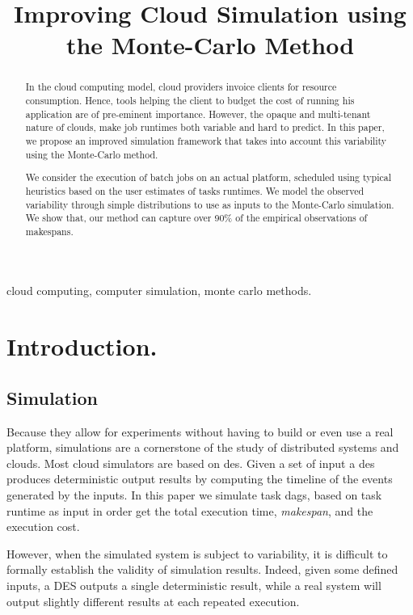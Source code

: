 \documentclass[10pt,conference,compsocconf]{IEEEtran}
\title{Improving Cloud Simulation using the Monte-Carlo Method}
\author{\IEEEauthorblockN{Luke~Bertot 
			and Stéphane~Genaud 
			and Julien~Gossa}
	\IEEEauthorblockA{Icube-ICPS --- UMR 7357, Univeristé de Strasbourg, CNRS\\
		P\^ole API Blvd S. Bant, 67400 Illkirch-Graffenstaden\\
		email: \url{lbertot@unistra.fr}, \url{genaud@unistra.fr}, \url{gossa@unistra.fr}}
	}
\begin{document}
\maketitle

\begin{abstract}
  In the  cloud computing  model, cloud providers  invoice clients  for resource
  consumption. Hence, tools helping the client to budget the cost of running his
  application are  of pre-eminent  importance. However, the opaque and 
  multi-tenant nature of clouds, make job runtimes both variable and hard to 
  predict.  In this  paper, we  propose an improved simulation framework that 
  takes into account  this variability using the Monte-Carlo method.

  We consider  the execution of batch jobs on  an actual platform, scheduled
  using typical  heuristics based  on the  user estimates  of tasks runtimes. We
  model  the observed  variability through  simple  distributions to use  as
  inputs  to the  Monte-Carlo  simulation. We show that, our method can capture 
  over  90\% of the empirical observations of makespans.
\end{abstract}

\begin{IEEEkeywords}
cloud computing, computer simulation, monte carlo methods.
\end{IEEEkeywords}


\section{Introduction.}

\subsection{Simulation}

Because they allow for experiments without having to build or even use a real 
platform, simulations are a cornerstone of the study of distributed
systems and clouds.  
Most cloud simulators  are based on \ac{des}. Given a set of input a \ac{des}
produces deterministic output results by computing the timeline of the events
generated by the inputs.  In this paper
we simulate task \acp{dag}, based on task runtime as input in order get the total
execution time, \emph{makespan}, and the execution cost.

However, when the simulated system is subject to variability, it is difficult
to formally establish  the  validity of  simulation  results. Indeed, given some
defined inputs, a DES outputs a single deterministic result, while a real system
will output  slightly different results  at each repeated execution.
\end{document}
